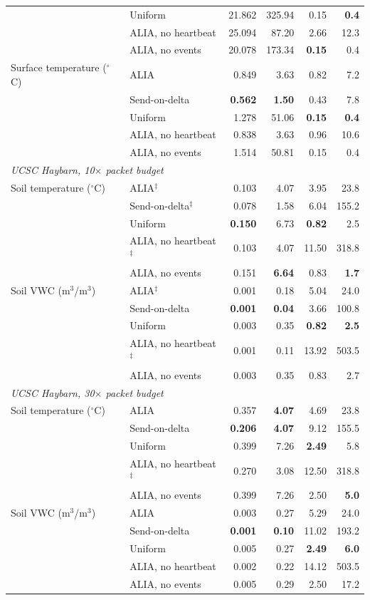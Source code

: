 \begin{tabular}{llrrrr}
 & Uniform & 21.862 & 325.94 & 0.15 & \textbf{0.4} \\
 & ALIA, no heartbeat & 25.094 & 87.20 & 2.66 & 12.3 \\
 & ALIA, no events & 20.078 & 173.34 & \textbf{0.15} & 0.4 \\
Surface temperature ($^\circ$C) & ALIA & 0.849 & 3.63 & 0.82 & 7.2 \\
 & Send-on-delta & \textbf{0.562} & \textbf{1.50} & 0.43 & 7.8 \\
 & Uniform & 1.278 & 51.06 & \textbf{0.15} & \textbf{0.4} \\
 & ALIA, no heartbeat & 0.838 & 3.63 & 0.96 & 10.6 \\
 & ALIA, no events & 1.514 & 50.81 & 0.15 & 0.4 \\
\midrule
\multicolumn{6}{l}{\emph{UCSC Haybarn, 10$\times$ packet budget}} \\
Soil temperature ($^\circ$C) & ALIA$^\ddagger$ & 0.103 & 4.07 & 3.95 & 23.8 \\
 & Send-on-delta$^\ddagger$ & 0.078 & 1.58 & 6.04 & 155.2 \\
 & Uniform & \textbf{0.150} & 6.73 & \textbf{0.82} & 2.5 \\
 & ALIA, no heartbeat$^\ddagger$ & 0.103 & 4.07 & 11.50 & 318.8 \\
 & ALIA, no events & 0.151 & \textbf{6.64} & 0.83 & \textbf{1.7} \\
Soil VWC (m$^3$/m$^3$) & ALIA$^\ddagger$ & 0.001 & 0.18 & 5.04 & 24.0 \\
 & Send-on-delta & \textbf{0.001} & \textbf{0.04} & 3.66 & 100.8 \\
 & Uniform & 0.003 & 0.35 & \textbf{0.82} & \textbf{2.5} \\
 & ALIA, no heartbeat$^\ddagger$ & 0.001 & 0.11 & 13.92 & 503.5 \\
 & ALIA, no events & 0.003 & 0.35 & 0.83 & 2.7 \\
\midrule
\multicolumn{6}{l}{\emph{UCSC Haybarn, 30$\times$ packet budget}} \\
Soil temperature ($^\circ$C) & ALIA & 0.357 & \textbf{4.07} & 4.69 & 23.8 \\
 & Send-on-delta & \textbf{0.206} & \textbf{4.07} & 9.12 & 155.5 \\
 & Uniform & 0.399 & 7.26 & \textbf{2.49} & 5.8 \\
 & ALIA, no heartbeat$^\ddagger$ & 0.270 & 3.08 & 12.50 & 318.8 \\
 & ALIA, no events & 0.399 & 7.26 & 2.50 & \textbf{5.0} \\
Soil VWC (m$^3$/m$^3$) & ALIA & 0.003 & 0.27 & 5.29 & 24.0 \\
 & Send-on-delta & \textbf{0.001} & \textbf{0.10} & 11.02 & 193.2 \\
 & Uniform & 0.005 & 0.27 & \textbf{2.49} & \textbf{6.0} \\
 & ALIA, no heartbeat & 0.002 & 0.22 & 14.12 & 503.5 \\
 & ALIA, no events & 0.005 & 0.29 & 2.50 & 17.2 \\
\bottomrule
\end{tabular}

